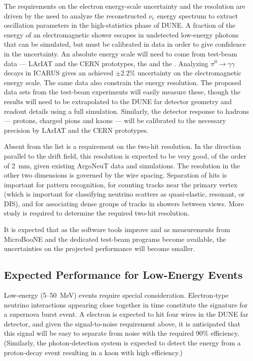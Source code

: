 The requirements on the electron energy-scale uncertainty and the
resolution are driven by the need to analyze the reconstructed $\nu_e$
energy spectrum to extract oscillation parameters in the
high-statistics phase of DUNE.  A fraction of the energy of an
electromagnetic shower escapes in undetected low-energy photons that
can be simulated, but  must be calibrated in data in order to give
confidence in the uncertainty.  An absolute energy scale will need to
come from test-beam data --- LArIAT and the CERN prototypes, the
\cernsingleproto{} and the \cerndualproto.  Analyzing
$\pi^0\rightarrow\gamma\gamma$ decays in ICARUS\cite{ICARUS-pizero}
gives an achieved $\pm 2.2$\% uncertainty on the electromagnetic
energy scale.  The same data also constrain the energy resolution.
The proposed data sets from the test-beam experiments will easily
measure these, though the results will need to be extrapolated to the
DUNE far detector geometry and readout details using a full
simulation.  Similarly, the detector response to hadrons --- protons,
charged pions and kaons --- will be calibrated to the necessary precision
by LArIAT and the CERN prototypes.


Absent from the list is a requirement on the two-hit resolution.  In the
direction parallel to the drift field, this resolution is expected to
be very good, of the order of 2~mm, given existing ArgoNeuT data and
simulations.  The resolution in the other two dimensions is governed
by the wire spacing.  Separation of hits is important for pattern
recognition, for counting tracks near the primary vertex (which is
important for classifying neutrino scatters as quasi-elastic,
resonant, or DIS), and for associating dense groups of tracks in
showers between views.  More study is required to determine
the required two-hit resolution.

It is expected that as the software tools improve and as measurements
from MicroBooNE and the dedicated test-beam programs become
available, the uncertainties on the projected performance will become
smaller.

\subsection{Expected Performance for Low-Energy Events}\label{sec:detectors-fd-ref-perf-lowe}

Low-energy (5--50~MeV) events require special consideration.
Electron-type neutrino interactions appearing close together in time
constitute the signature for a supernova burst event.  A  electron
is expected to hit four wires in the DUNE far detector, and given the
signal-to-noise requirement above, it is anticipated that this signal
will be easy to separate from noise with the required 90\% efficiency.
(Similarly, the photon-detection system is expected to detect the energy
from a proton-decay event resulting in a   kaon with high
efficiency.)

